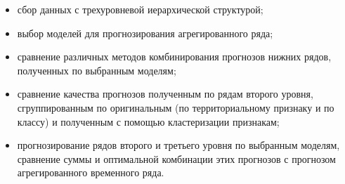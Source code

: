 \documentclass[12pt,a4paper, oneside]{extreport}
\begin{document}



\begin{itemize}
	\item сбор данных с трехуровневой иерархической структурой;
	\item выбор моделей для прогнозирования агрегированного ряда;
	\item сравнение различных методов комбинирования прогнозов нижних рядов, полученных по выбранным моделям; 
	\item сравнение качества прогнозов полученным по рядам второго уровня, сгруппированным по оригинальным  (по территориальному признаку и по классу) и полученным с помощью кластеризации признакам;
	\item прогнозирование рядов второго и третьего уровня по выбранным моделям, сравнение суммы и оптимальной комбинации этих прогнозов с прогнозом агрегированного временного ряда.












\end{itemize}


\end{document}
